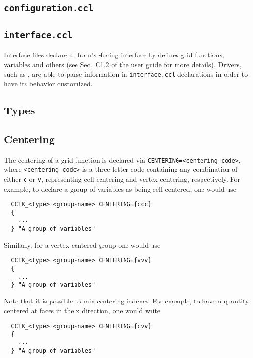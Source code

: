 \subsection{\texttt{configuration.ccl}}


\subsection{\texttt{interface.ccl}}

Interface files declare a thorn's \Cactus-facing interface by defines grid functions, variables and others (see Sec.~C1.2 of the \Cactus user guide for more details). Drivers, such as \CarpetX, are able to parse information in \texttt{interface.ccl} declarations in order to have its behavior customized. 

\subsection{Types}


\subsection{Centering}

The centering of a grid function is declared via \texttt{CENTERING={<centering-code>}}, where \texttt{<centering-code>} is a three-letter code containing any combination of either \texttt{c} or \texttt{v}, representing cell centering and vertex centering, respectively. For example, to declare a group of variables as being cell centered, one would use
%
\begin{lstlisting}
  CCTK_<type> <group-name> CENTERING={ccc}
  {
    ...
  } "A group of variables"
\end{lstlisting}

Similarly, for a vertex centered group one would use
%
\begin{lstlisting}
  CCTK_<type> <group-name> CENTERING={vvv}
  {
    ...
  } "A group of variables"
\end{lstlisting}

Note that it is possible to mix centering indexes. For example, to have a quantity centered at faces in the x direction, one would write
%
\begin{lstlisting}
  CCTK_<type> <group-name> CENTERING={cvv}
  {
    ...
  } "A group of variables"
\end{lstlisting}

